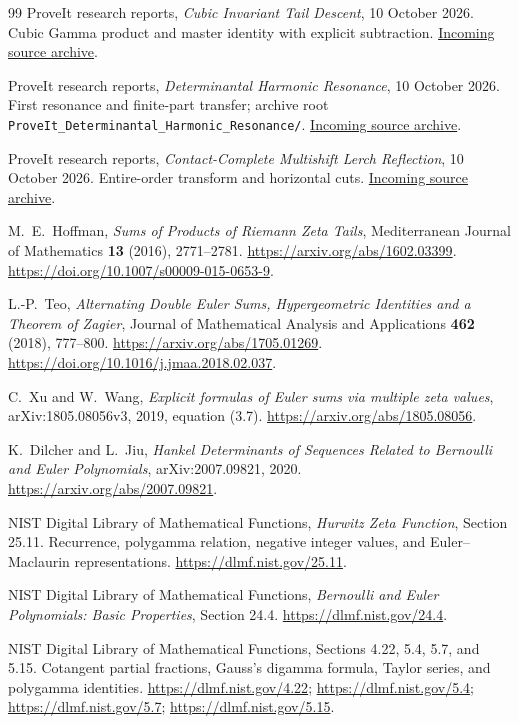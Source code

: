 \documentclass[11pt]{article}
\theoremstyle{definition}
\theoremstyle{remark}
\numberwithin{equation}{section}
\begin{document}
\begin{thebibliography}{99}
ProveIt research reports,
\emph{Cubic Invariant Tail Descent}, 10 October 2026.
Cubic Gamma product and master identity with explicit subtraction.
\href{https://github.com/VladimirReshetnikov/ProveIt/blob/446dca9bd65c20e409d1d2561d4ffad408103e2a/docs/incoming/ProveIt_Cubic_Tail_Descent_2026-10-10.zip}{Incoming source archive}.

ProveIt research reports,
\emph{Determinantal Harmonic Resonance}, 10 October 2026.
First resonance and finite-part transfer; archive root
\texttt{ProveIt\_Determinantal\_Harmonic\_Resonance/}.
\href{https://github.com/VladimirReshetnikov/ProveIt/blob/446dca9bd65c20e409d1d2561d4ffad408103e2a/docs/incoming/ProveIt_Determinantal_Harmonic_Resonance_2026-10-10.zip}{Incoming source archive}.

ProveIt research reports,
\emph{Contact-Complete Multishift Lerch Reflection},
10 October 2026. Entire-order transform and horizontal cuts.
\href{https://github.com/VladimirReshetnikov/ProveIt/blob/446dca9bd65c20e409d1d2561d4ffad408103e2a/docs/incoming/ProveIt_Multishift_Reflection_2026-10-10.zip}{Incoming source archive}.

M.~E.~Hoffman,
\emph{Sums of Products of Riemann Zeta Tails},
Mediterranean Journal of Mathematics \textbf{13} (2016), 2771--2781.
\url{https://arxiv.org/abs/1602.03399}.
\url{https://doi.org/10.1007/s00009-015-0653-9}.

L.-P.~Teo,
\emph{Alternating Double Euler Sums, Hypergeometric Identities and a
Theorem of Zagier},
Journal of Mathematical Analysis and Applications \textbf{462}
(2018), 777--800.
\url{https://arxiv.org/abs/1705.01269}.
\url{https://doi.org/10.1016/j.jmaa.2018.02.037}.

C.~Xu and W.~Wang,
\emph{Explicit formulas of Euler sums via multiple zeta values},
arXiv:1805.08056v3, 2019, equation (3.7).
\url{https://arxiv.org/abs/1805.08056}.

K.~Dilcher and L.~Jiu,
\emph{Hankel Determinants of Sequences Related to Bernoulli and Euler
Polynomials}, arXiv:2007.09821, 2020.
\url{https://arxiv.org/abs/2007.09821}.

NIST Digital Library of Mathematical Functions,
\emph{Hurwitz Zeta Function}, Section 25.11.
Recurrence, polygamma relation, negative integer values,
and Euler--Maclaurin representations.
\url{https://dlmf.nist.gov/25.11}.

NIST Digital Library of Mathematical Functions,
\emph{Bernoulli and Euler Polynomials: Basic Properties}, Section 24.4.
\url{https://dlmf.nist.gov/24.4}.

NIST Digital Library of Mathematical Functions,
Sections 4.22, 5.4, 5.7, and 5.15.
Cotangent partial fractions, Gauss's digamma formula, Taylor series,
and polygamma identities.
\url{https://dlmf.nist.gov/4.22};
\url{https://dlmf.nist.gov/5.4};
\url{https://dlmf.nist.gov/5.7};
\url{https://dlmf.nist.gov/5.15}.

\end{thebibliography}

\end{document}
